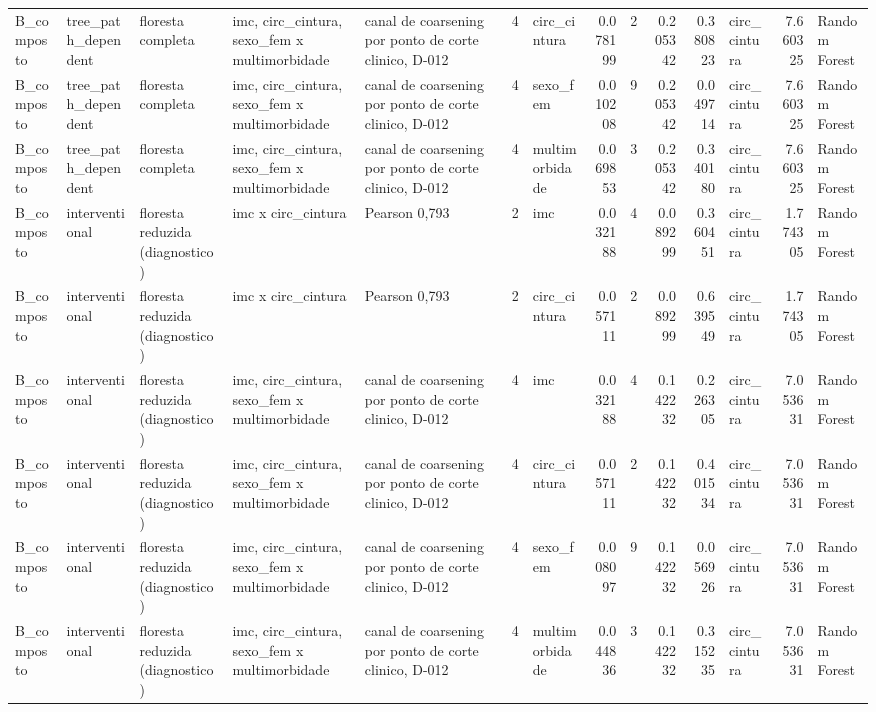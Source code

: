 \begin{tabular}{lllllrlrrrrlrl}
B_composto & tree_path_dependent & floresta completa & imc, circ_cintura, sexo_fem x multimorbidade & canal de coarsening por ponto de corte clinico, D-012 & 4 & circ_cintura & 0.078199 & 2 & 0.205342 & 0.380823 & circ_cintura & 7.660325 & Random Forest \\
B_composto & tree_path_dependent & floresta completa & imc, circ_cintura, sexo_fem x multimorbidade & canal de coarsening por ponto de corte clinico, D-012 & 4 & sexo_fem & 0.010208 & 9 & 0.205342 & 0.049714 & circ_cintura & 7.660325 & Random Forest \\
B_composto & tree_path_dependent & floresta completa & imc, circ_cintura, sexo_fem x multimorbidade & canal de coarsening por ponto de corte clinico, D-012 & 4 & multimorbidade & 0.069853 & 3 & 0.205342 & 0.340180 & circ_cintura & 7.660325 & Random Forest \\
B_composto & interventional & floresta reduzida (diagnostico) & imc x circ_cintura & Pearson 0,793 & 2 & imc & 0.032188 & 4 & 0.089299 & 0.360451 & circ_cintura & 1.774305 & Random Forest \\
B_composto & interventional & floresta reduzida (diagnostico) & imc x circ_cintura & Pearson 0,793 & 2 & circ_cintura & 0.057111 & 2 & 0.089299 & 0.639549 & circ_cintura & 1.774305 & Random Forest \\
B_composto & interventional & floresta reduzida (diagnostico) & imc, circ_cintura, sexo_fem x multimorbidade & canal de coarsening por ponto de corte clinico, D-012 & 4 & imc & 0.032188 & 4 & 0.142232 & 0.226305 & circ_cintura & 7.053631 & Random Forest \\
B_composto & interventional & floresta reduzida (diagnostico) & imc, circ_cintura, sexo_fem x multimorbidade & canal de coarsening por ponto de corte clinico, D-012 & 4 & circ_cintura & 0.057111 & 2 & 0.142232 & 0.401534 & circ_cintura & 7.053631 & Random Forest \\
B_composto & interventional & floresta reduzida (diagnostico) & imc, circ_cintura, sexo_fem x multimorbidade & canal de coarsening por ponto de corte clinico, D-012 & 4 & sexo_fem & 0.008097 & 9 & 0.142232 & 0.056926 & circ_cintura & 7.053631 & Random Forest \\
B_composto & interventional & floresta reduzida (diagnostico) & imc, circ_cintura, sexo_fem x multimorbidade & canal de coarsening por ponto de corte clinico, D-012 & 4 & multimorbidade & 0.044836 & 3 & 0.142232 & 0.315235 & circ_cintura & 7.053631 & Random Forest \\
\bottomrule
\end{tabular}

